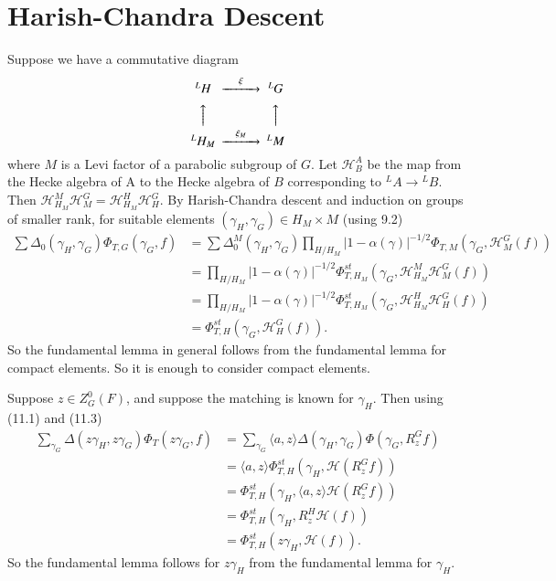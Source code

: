 \documentclass{amsart}
\def\hgam{\gamma_H}
\def\ggam{\gamma_G}
\begin{document}
\section{Harish-Chandra Descent} %

Suppose we have a commutative diagram
$$
\begin{CD}
{}^LH @>\xi>> {}^LG\\
@AAA  @AAA\\
{}^L{H_M} @>{\xi_M}>> {}^LM
\end{CD}
$$
where $M$ is a Levi factor of a parabolic subgroup 
of $G$.  Let $\mathcal{ H}_B^A$ be the map from the Hecke algebra of A to the Hecke algebra
of $B$ corresponding to ${}^LA\to {}^LB$.  Then
$\mathcal{ H}_{H_M}^M\mathcal{ H}_{M}^G=\mathcal{ H}_{H_M}^H\mathcal{ H}_H^G$. 
By Harish-Chandra descent and induction on groups of
smaller rank, for suitable elements
$(\hgam,\ggam)\in H_M\times M$ (using 9.2)
$$
\begin{array}{lll}
\sum \Delta_0(\hgam,\ggam)\Phi_{T,G}(\ggam,f)
&=\sum\Delta_0^M(\hgam,\ggam)\prod_{H/H_M}|1-\alpha(\gamma)|^{-1/2}\Phi_{T,M}
       (\ggam,\mathcal{ H}_M^G(f))\\
&=\prod_{H/H_M}|1-\alpha(\gamma)|^{-1/2}\Phi_{T,H_M}^{st}(\ggam,\mathcal{ H}_{H_M}^M\mathcal{ H}_M^G(f))\\
&=\prod_{H/H_M}|1-\alpha(\gamma)|^{-1/2}\Phi_{T,H_M}^{st}(\ggam,\mathcal{ H}_{H_M}^H\mathcal{ H}_H^G(f))\\
&=\Phi_{T,H}^{st}(\ggam,\mathcal{ H}_H^G(f)).
\end{array}
$$
So the fundamental lemma in general follows from the fundamental lemma for
compact elements.  So it is enough to consider compact elements.

Suppose $z\in Z_G^0(F)$,
and suppose the matching is known for $\hgam$.
Then using (11.1) and (11.3)
$$
\begin{array}{lll}
\sum_{\ggam}\Delta(z\hgam,z\ggam)\Phi_T(z\ggam,f)
&=\sum_{\ggam}\langle a,z\rangle
\Delta(\hgam,\ggam)\Phi(\ggam,R_z^Gf)\\
&=\langle a,z\rangle\Phi_{T,H}^{st}(\hgam,\mathcal{ H}(R_z^Gf)) \\
&=\Phi_{T,H}^{st}(\hgam,\langle a,z\rangle\mathcal{ H}(R_z^Gf))\\
&=\Phi_{T,H}^{st}(\hgam,R_z^H\mathcal{ H}(f))\\
&=\Phi_{T,H}^{st}(z\hgam,\mathcal{ H}(f)).
\end{array}
$$
So the fundamental lemma follows
for $z\hgam$ from the 
fundamental lemma for $\hgam$. 
\end{document}
